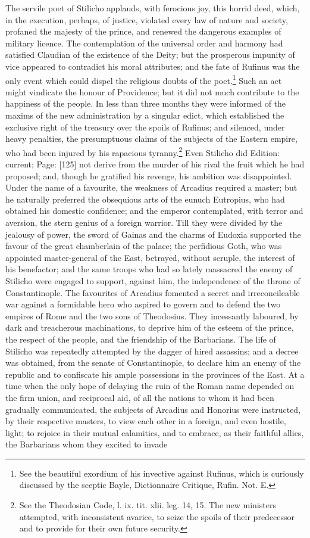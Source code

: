 The servile poet of Stilicho applauds, with ferocious joy, this horrid deed, which, in the execution, perhaps, of justice, violated every law of nature and society, profaned the majesty of the prince, and renewed the dangerous examples of military licence. The contemplation of the universal order and harmony had satisfied Claudian of the existence of the Deity; but the prosperous impunity of vice appeared to contradict his moral attributes; and the fate of Rufinus was the only event which could dispel the religious doubts of the poet.\footnote{See the beautiful exordium of his invective against Rufinus, which is curiously discussed by the sceptic Bayle, Dictionnaire Critique, Rufin. Not. E.} Such an act might vindicate the honour of Providence; but it did not much contribute to the happiness of the people. In less than three months they were informed of the maxims of the new administration by a singular edict, which established the exclusive right of the treasury over the spoils of Rufinus; and silenced, under heavy penalties, the presumptuous claims of the subjects of the Eastern empire, who had been injured by his rapacious tyranny.\footnote{See the Theodosian Code, l. ix. tit. xlii. leg. 14, 15. The new ministers attempted, with inconsistent avarice, to seize the spoils of their predecessor and to provide for their own future security.} Even Stilicho did Edition: current; Page: [125] not derive from the murder of his rival the fruit which he had proposed; and, though he gratified his revenge, his ambition was disappointed. Under the name of a favourite, the weakness of Arcadius required a master; but he naturally preferred the obsequious arts of the eunuch Eutropius, who had obtained his domestic confidence; and the emperor contemplated, with terror and aversion, the stern genius of a foreign warrior. Till they were divided by the jealousy of power, the sword of Gainas and the charms of Eudoxia supported the favour of the great chamberlain of the palace; the perfidious Goth, who was appointed master-general of the East, betrayed, without scruple, the interest of his benefactor; and the same troops who had so lately massacred the enemy of Stilicho were engaged to support, against him, the independence of the throne of Constantinople. The favourites of Arcadius fomented a secret and irreconcileable war against a formidable hero who aspired to govern and to defend the two empires of Rome and the two sons of Theodosius. They incessantly laboured, by dark and treacherous machinations, to deprive him of the esteem of the prince, the respect of the people, and the friendship of the Barbarians. The life of Stilicho was repeatedly attempted by the dagger of hired assassins; and a decree was obtained, from the senate of Constantinople, to declare him an enemy of the republic and to confiscate his ample possessions in the provinces of the East. At a time when the only hope of delaying the ruin of the Roman name depended on the firm union, and reciprocal aid, of all the nations to whom it had been gradually communicated, the subjects of Arcadius and Honorius were instructed, by their respective masters, to view each other in a foreign, and even hostile, light; to rejoice in their mutual calamities, and to embrace, as their faithful allies, the Barbarians whom they excited to invade 